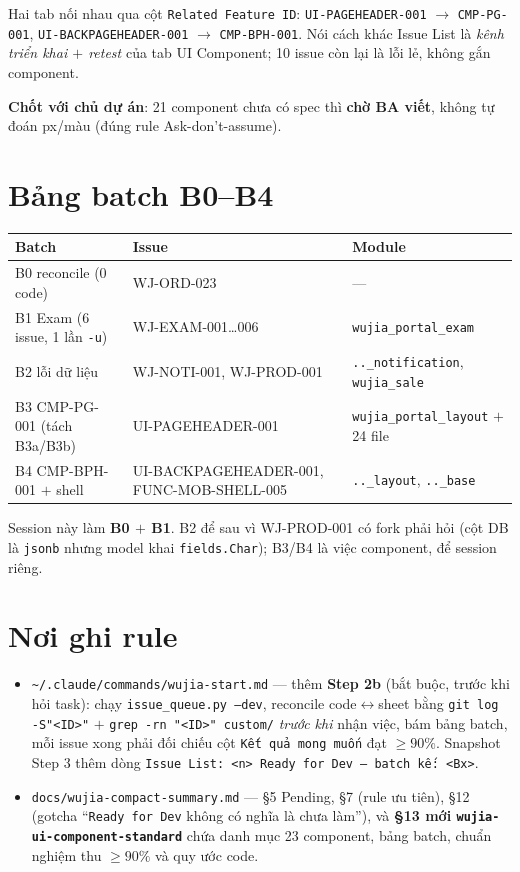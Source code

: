 Hai tab nối nhau qua cột \texttt{Related Feature ID}: \texttt{UI-PAGEHEADER-001} $\rightarrow$
\texttt{CMP-PG-001}, \texttt{UI-BACKPAGEHEADER-001} $\rightarrow$ \texttt{CMP-BPH-001}. Nói cách
khác Issue List là \emph{kênh triển khai $+$ retest} của tab UI Component; 10 issue còn lại là
lỗi lẻ, không gắn component.

\textbf{Chốt với chủ dự án}: 21 component chưa có spec thì \textbf{chờ BA viết}, không tự đoán
px/màu (đúng rule Ask-don't-assume).

\section{Bảng batch B0--B4}

\begin{center}
\begin{tabular}{lll}
\hline
\textbf{Batch} & \textbf{Issue} & \textbf{Module} \\
\hline
B0 reconcile (0 code) & WJ-ORD-023 & --- \\
B1 Exam (6 issue, 1 lần \texttt{-u}) & WJ-EXAM-001\ldots006 & \texttt{wujia\_portal\_exam} \\
B2 lỗi dữ liệu & WJ-NOTI-001, WJ-PROD-001 & \texttt{..\_notification}, \texttt{wujia\_sale} \\
B3 CMP-PG-001 (tách B3a/B3b) & UI-PAGEHEADER-001 & \texttt{wujia\_portal\_layout} $+$ 24 file \\
B4 CMP-BPH-001 $+$ shell & UI-BACKPAGEHEADER-001, FUNC-MOB-SHELL-005 & \texttt{..\_layout}, \texttt{..\_base} \\
\hline
\end{tabular}
\end{center}

Session này làm \textbf{B0 $+$ B1}. B2 để sau vì WJ-PROD-001 có fork phải hỏi (cột DB là
\texttt{jsonb} nhưng model khai \texttt{fields.Char}); B3/B4 là việc component, để session riêng.

\section{Nơi ghi rule}

\begin{itemize}
  \item \texttt{\textasciitilde/.claude/commands/wujia-start.md} --- thêm \textbf{Step 2b} (bắt
    buộc, trước khi hỏi task): chạy \texttt{issue\_queue.py --dev}, reconcile code$\leftrightarrow$sheet
    bằng \texttt{git log -S"<ID>"} $+$ \texttt{grep -rn "<ID>" custom/} \emph{trước khi} nhận
    việc, bám bảng batch, mỗi issue xong phải đối chiếu cột \texttt{Kết quả mong muốn} đạt
    $\ge90\%$. Snapshot Step 3 thêm dòng \texttt{Issue List: <n> Ready for Dev --- batch kế: <Bx>}.
  \item \texttt{docs/wujia-compact-summary.md} --- §5 Pending, §7 (rule ưu tiên), §12 (gotcha
    ``\texttt{Ready for Dev} không có nghĩa là chưa làm''), và \textbf{§13 mới
    \texttt{wujia-ui-component-standard}} chứa danh mục 23 component, bảng batch, chuẩn nghiệm
    thu $\ge90\%$ và quy ước code.
\end{itemize}

